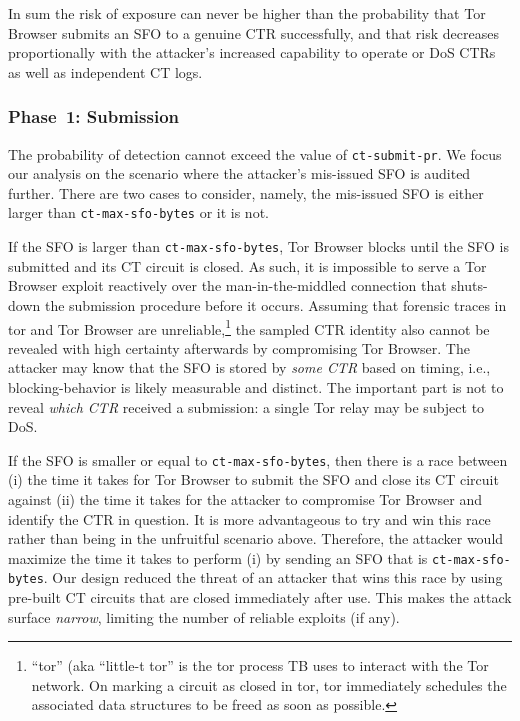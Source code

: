 In sum the risk of exposure can never be higher than the probability that Tor
Browser submits an SFO to a genuine CTR successfully, and that risk decreases
proportionally with the attacker's increased capability to operate or DoS CTRs
as well as independent CT logs.

\subsubsection{Phase~1: Submission} \label{sec:analysis:pr:phase1}
The probability of detection cannot exceed the value of \texttt{ct-submit-pr}.
We focus our analysis on the scenario where the
attacker's mis-issued SFO is audited further.  There are two cases to consider,
namely, the mis-issued SFO is either larger than \texttt{ct-max-sfo-bytes} or it
is not.

If the SFO is larger than \texttt{ct-max-sfo-bytes}, Tor Browser blocks until
the SFO is submitted and its CT circuit is closed.  As such, it is impossible to
serve a Tor Browser exploit reactively over the man-in-the-middled connection
that shuts-down the submission procedure before it occurs.  Assuming that
forensic traces in tor and Tor Browser are unreliable,\footnote{%
	``tor'' (aka ``little-t tor'' is the tor process TB uses to interact
        with the Tor network.
        On marking a circuit as closed in tor, tor immediately schedules the
	associated data structures to be freed as soon as possible.
} the sampled CTR identity also cannot be revealed with high certainty
afterwards by compromising Tor Browser.  The attacker may know that the SFO is
stored by \emph{some CTR} based on timing, i.e., blocking-behavior is likely
measurable and distinct.  The important part is not to reveal \emph{which CTR}
received a submission:  a single Tor relay may be subject to DoS.

If the SFO is smaller or equal to \texttt{ct-max-sfo-bytes}, then there is a
race between (i) the time it takes for Tor Browser to submit the SFO and close
its CT circuit against (ii) the time it takes for the attacker to compromise Tor
Browser and identify the CTR in question.  It is more advantageous to try and
win this race rather than being in the unfruitful scenario above.  Therefore,
the attacker would maximize the time it takes to perform (i) by sending an SFO
that is \texttt{ct-max-sfo-bytes}.  Our design reduced the threat of an attacker
that wins this race by using pre-built CT circuits that are closed immediately
after use.  This makes the attack surface \emph{narrow}, limiting the number of
reliable exploits (if any).

